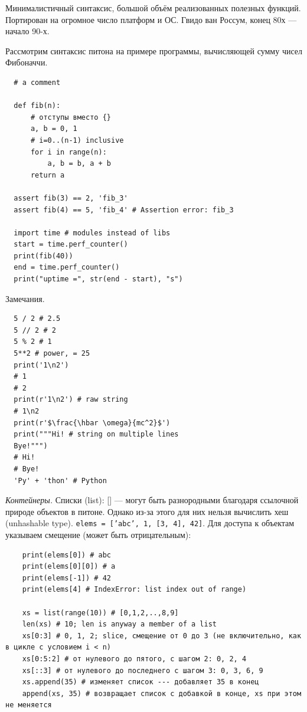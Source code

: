 \documentclass{book}
\begin{document}
Минималистичный синтаксис, большой объём реализованных полезных функций.
Портирован на огромное число платформ и ОС. Гвидо
ван Россум, конец 80х --- начало 90-х.

Рассмотрим синтаксис питона на примере программы, вычисляющей сумму чисел Фибоначчи.
\begin{verbatim}
  # a comment

  def fib(n):
      # отступы вместо {}
      a, b = 0, 1
      # i=0..(n-1) inclusive
      for i in range(n):
          a, b = b, a + b
      return a

  assert fib(3) == 2, 'fib_3'
  assert fib(4) == 5, 'fib_4' # Assertion error: fib_3

  import time # modules instead of libs
  start = time.perf_counter()
  print(fib(40))
  end = time.perf_counter()
  print("uptime =", str(end - start), "s")
\end{verbatim}

Замечания.
\begin{verbatim}
  5 / 2 # 2.5
  5 // 2 # 2
  5 % 2 # 1
  5**2 # power, = 25
  print('1\n2')
  # 1
  # 2
  print(r'1\n2') # raw string
  # 1\n2
  print(r'$\frac{\hbar \omega}{mc^2}$')
  print("""Hi! # string on multiple lines
  Bye!""")
  # Hi!
  # Bye!
  'Py' + 'thon' # Python
\end{verbatim}

\textit{Контейнеры.} Списки (list): [] --- могут быть разнородными благодаря ссылочной природе объектов в питоне. Однако из-за этого для них
нельзя вычислить хеш (unhashable type).
\texttt{elems = ['abc', 1, [3, 4], 42]}. Для доступа к объектам указываем смещение (может быть отрицательным):
\begin{verbatim}
    print(elems[0]) # abc
    print(elems[0][0]) # a
    print(elems[-1]) # 42
    print(elems[4] # IndexError: list index out of range)

    xs = list(range(10)) # [0,1,2,..,8,9]
    len(xs) # 10; len is anyway a member of a list
    xs[0:3] # 0, 1, 2; slice, смещение от 0 до 3 (не включительно, как в цикле с условием i < n)
    xs[0:5:2] # от нулевого до пятого, с шагом 2: 0, 2, 4
    xs[::3] # от нулевого до последнего с шагом 3: 0, 3, 6, 9
    xs.append(35) # изменяет список --- добавляет 35 в конец
    append(xs, 35) # возвращает список с добавкой в конце, xs при этом не меняется
\end{verbatim}
\end{document}
